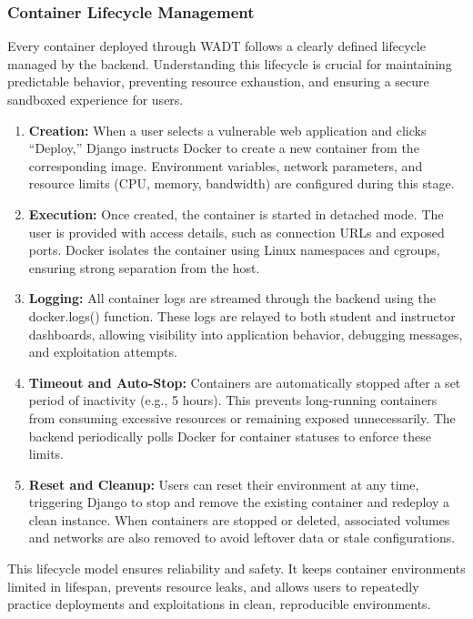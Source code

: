 \documentclass[12pt,titlepage]{article}
\begin{document}
\subsubsection{Container Lifecycle Management}
Every container deployed through WADT follows a clearly defined lifecycle managed by the backend. Understanding this lifecycle is crucial for maintaining predictable behavior, preventing resource exhaustion, and ensuring a secure sandboxed experience for users.

\begin{enumerate}
    \item \textbf{Creation:} When a user selects a vulnerable web application and clicks “Deploy,” Django instructs Docker to create a new container from the corresponding image. Environment variables, network parameters, and resource limits (CPU, memory, bandwidth) are configured during this stage.
    \item \textbf{Execution:} Once created, the container is started in detached mode. The user is provided with access details, such as connection URLs and exposed ports. Docker isolates the container using Linux namespaces and cgroups, ensuring strong separation from the host.
    \item \textbf{Logging:} All container logs are streamed through the backend using the docker.logs() function. These logs are relayed to both student and instructor dashboards, allowing visibility into application behavior, debugging messages, and exploitation attempts.
    \item \textbf{Timeout and Auto-Stop:} Containers are automatically stopped after a set period of inactivity (e.g., 5 hours). This prevents long-running containers from consuming excessive resources or remaining exposed unnecessarily. The backend periodically polls Docker for container statuses to enforce these limits.
    \item \textbf{Reset and Cleanup:} Users can reset their environment at any time, triggering Django to stop and remove the existing container and redeploy a clean instance. When containers are stopped or deleted, associated volumes and networks are also removed to avoid leftover data or stale configurations.
\end{enumerate}

This lifecycle model ensures reliability and safety. It keeps container environments limited in lifespan, prevents resource leaks, and allows users to repeatedly practice deployments and exploitations in clean, reproducible environments.
\end{document}
